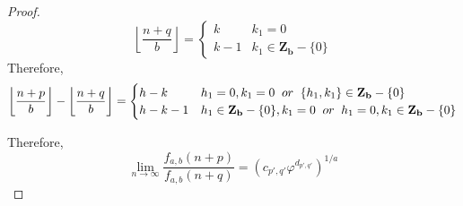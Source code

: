\documentclass[preprint,12pt]{elsarticle}
\begin{document}
\begin{proof}
\begin{equation*}
	\left\lfloor\dfrac{n + q}{b}\right\rfloor = \begin{cases}
	k & k_1 = 0\\
	k - 1 & k_1 \in \mathbf{Z_b} - \{0\}
	\end{cases}
	\end{equation*}
	Therefore,\\
	\begin{equation*}
	\left\lfloor\dfrac{n + p}{b}\right\rfloor -\left\lfloor\dfrac{n + q}{b}\right\rfloor  = \begin{cases}
	h - k & h_1 = 0, k_1 = 0 \hspace{2mm}or\hspace{2mm}\{h_1, k_1\} \in \mathbf{Z_b} - \{0\}\\
	h - k - 1 & h_1 \in \mathbf{Z_b} - \{0\}, k_1 = 0\hspace{2mm}or\hspace{2mm} h_1= 0, k_1 \in \mathbf{Z_b} - \{0\}
	\end{cases}
	\end{equation*}
	
	Therefore,\\
	$$\lim_{n \to \infty} \dfrac{f_{a,b}(n + p)}{f_{a,b}(n + q)} = \left(c_{p',q'}\varphi^{d_{p',q'}}\right)^{1/a}$$
\end{proof}
\end{document}
